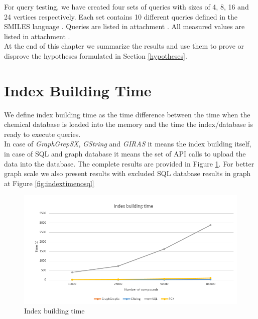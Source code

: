 For query testing, we have created four sets of queries with sizes of 4, 8, 16 and 24 vertices respectively. Each set contains 10 different queries defined in the SMILES language \cite{smiles}. Queries are listed in attachment . All measured values are listed in attachment .\\

At the end of this chapter we summarize the results and use them to prove or disprove the hypotheses formulated in Section \ref{hypotheses}.

\section{Index Building Time}

We define index building time as the time difference between the time when the chemical database is loaded into the memory and the time the index/database is ready to execute queries.\\

In case of \textit{GraphGrepSX}, \textit{GString} and \textit{GIRAS} it means the index building itself, in case of SQL and graph database it means the set of API calls to upload the data into the database. The complete results are provided in Figure \ref{fig:indextime}. For better graph scale we also present results with excluded SQL database results in graph at Figure \ref{fig:indextimenosql}\\

\begin{figure}[h]
	\centering
	\includegraphics[width=1\textwidth]{../img/indexBuildingTime.png}
	\caption{Index building time}
	\label{fig:indextime}
\end{figure}

